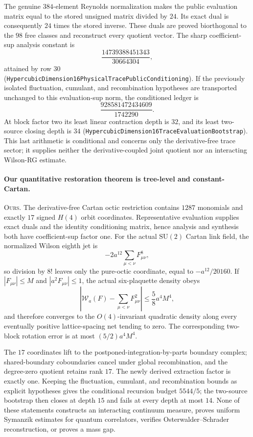 \documentclass[11pt]{article}
\theoremstyle{definition}
\begin{document}
The genuine $384$-element Reynolds normalization makes the public evaluation
matrix equal to the stored unsigned matrix divided by $24$.  Its exact dual
is consequently $24$ times the stored inverse.  These duals are proved
biorthogonal to the $98$ free classes and reconstruct every quotient vector.
The sharp coefficient-sup analysis constant is
\[
  \frac{14739388451343}{30664304},
\]
attained by row $30$
(\texttt{HypercubicDimension16PhysicalTracePublicConditioning}).  If the
previously isolated fluctuation, cumulant, and recombination hypotheses are
transported unchanged to this evaluation-sup norm, the conditioned ledger is
\[
  \frac{928581472434609}{1742290}.
\]
At block factor two its least linear contraction depth is $32$, and its least
two-source closing depth is $34$
(\texttt{HypercubicDimension16TraceEvaluationBootstrap}).  This last
arithmetic is conditional and concerns only the derivative-free trace
sector; it supplies neither the derivative-coupled joint quotient nor an
interacting Wilson-RG estimate.

\paragraph{Our quantitative restoration theorem is tree-level and
constant-Cartan.}
\textsc{Ours.} The derivative-free Cartan octic restriction contains $1287$
monomials and exactly $17$ signed $H(4)$ orbit coordinates. Representative
evaluation supplies exact duals and the identity conditioning matrix, hence
analysis and synthesis both have coefficient-sup factor one. For the actual
$\mathrm{SU}(2)$ Cartan link field, the normalized Wilson eighth jet is
\[
  -2a^{12}\sum_{\mu<\nu}F_{\mu\nu}^{8},
\]
so division by $8!$ leaves only the pure-octic coordinate, equal to
$-a^{12}/20160$. If $|F_{\mu\nu}|\leq M$ and
$|a^2F_{\mu\nu}|\leq1$, the actual six-plaquette density obeys
\[
 \left|\mathcal W_a(F)-\sum_{\mu<\nu}F_{\mu\nu}^{2}\right|
 \leq \frac58 a^4M^4,
\]
and therefore converges to the $O(4)$-invariant quadratic density along every
eventually positive lattice-spacing net tending to zero. The corresponding
two-block rotation error is at most $(5/2)a^4M^4$.

The $17$ coordinates lift to the postponed-integration-by-parts boundary
complex; shared-boundary coboundaries cancel under global recombination, and
the degree-zero quotient retains rank $17$. The newly derived extraction
factor is exactly one. Keeping the fluctuation, cumulant, and recombination
bounds as explicit hypotheses gives the conditional recursion budget
$5544/5$; the two-source bootstrap then closes at depth $15$ and fails at
every depth at most $14$. None of these statements constructs an interacting
continuum measure, proves uniform Symanzik estimates for quantum
correlators, verifies Osterwalder--Schrader reconstruction, or proves a mass
gap.
\end{document}
